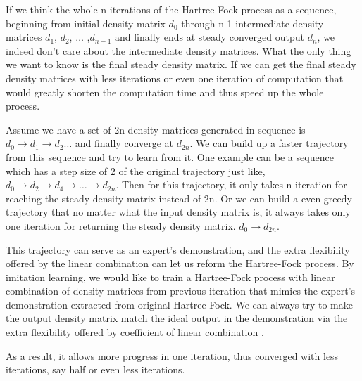 \documentclass[twoside]{article}
\begin{document}
If we think the whole n iterations of the Hartree-Fock process as a sequence, beginning from initial density matrix $d_0$ through n-1 intermediate density matrices $d_1$,  $d_2$,  $\ldots$ ,$d_{n-1}$ and finally ends at steady converged output $d_{n}$, we indeed don't care about the intermediate density matrices. What the only thing we want to know is the final steady density matrix. If we can get the final steady density matrices with less iterations or even one iteration of computation that would greatly shorten the computation time and thus speed up the whole process. 



Assume we have a set of 2n density matrices generated in sequence is  $d_0 \rightarrow  d_1 \rightarrow  d_2  \ldots  $ and finally converge at $d_{2n}$. 
We can build up a faster trajectory from this sequence and try to learn from it.
One example can be a sequence which has a step size of 2 of the original trajectory just like,$d_0 \rightarrow d_2 \rightarrow  d_4 \rightarrow  \ldots \rightarrow  d_{2n}$. Then for this trajectory, it only takes n iteration for reaching the steady density matrix instead of 2n.
Or we can build a even greedy trajectory that no matter what the input density matrix is, it always takes only one iteration for returning the steady density matrix. $d_0 \rightarrow d_{2n}$.


This trajectory can serve as an expert's demonstration, and the extra flexibility offered by the linear combination can let us reform the Hartree-Fock process. By imitation learning, we would like to train a Hartree-Fock process with linear combination of density matrices from previous iteration that mimics the expert's demonstration extracted from original Hartree-Fock. We can always try to make the output density matrix match the ideal output in the demonstration via the extra flexibility offered by coefficient of linear combination .


As a result, it allows more progress in one iteration, thus converged with less iterations, say half or even less iterations.  
\end{document}
